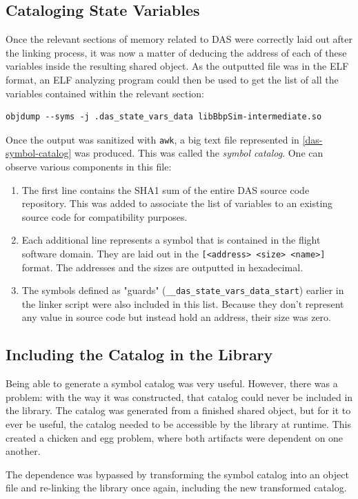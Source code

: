 {\subsection*{Cataloging State Variables}
Once the relevant sections of memory related to DAS were correctly laid out after the linking process, it was now a matter of deducing the address of each of these variables inside the resulting shared object. As the outputted file was in the ELF format, an ELF analyzing program could then be used to get the list of all the variables contained within the relevant section:
\begin{verbatim}
objdump --syms -j .das_state_vars_data libBbpSim-intermediate.so
\end{verbatim}
Once the output was sanitized with \texttt{awk}, a big text file represented in  \autoref{das-symbol-catalog} was produced. This was called the \textit{symbol catalog}. One can observe various components in this file:
\begin{enumerate}
	\item The first line contains the SHA1 sum of the entire DAS source code repository. This was added to associate the list of variables to an existing source code for compatibility purposes.
	\item Each additional line represents a symbol that is contained in the flight software domain. They are laid out in the \verb|[<address> <size> <name>]| format. The addresses and the sizes are outputted in hexadecimal.
	\item The symbols defined as "guards" (\texttt{__das_state_vars_data_start}) earlier in the linker script were also included in this list. Because they don't represent any value in source code but instead hold an address, their size was zero.
\end{enumerate}

\subsection*{Including the Catalog in the Library}
Being able to generate a symbol catalog was very useful. However, there was a problem: with the way it was constructed, that catalog could never be included in the library. The catalog was generated from a finished shared object, but for it to ever be useful, the catalog needed to be accessible by the library at runtime. This created a chicken and egg problem, where both artifacts were dependent on one another.

The dependence was bypassed by transforming the symbol catalog into an object file and re-linking the library once again, including the new transformed catalog. 

}
